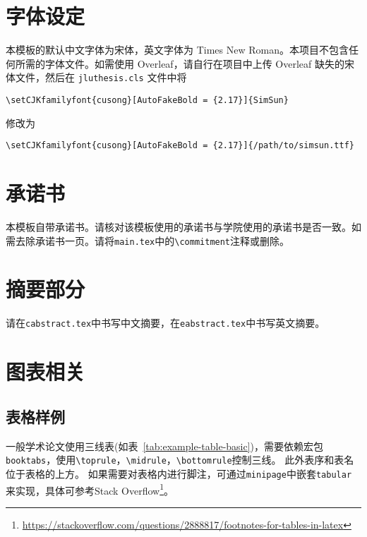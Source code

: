 \section{字体设定}
\label{sec:fontset}

本模板的默认中文字体为宋体，英文字体为 Times New Roman。本项目不包含任何所需的字体文件。如需使用 Overleaf，请自行在项目中上传 Overleaf 缺失的宋体文件，然后在 \verb|jluthesis.cls| 文件中将 
\begin{Verbatim}
\setCJKfamilyfont{cusong}[AutoFakeBold = {2.17}]{SimSun}
\end{Verbatim}
修改为
\begin{Verbatim}
\setCJKfamilyfont{cusong}[AutoFakeBold = {2.17}]{/path/to/simsun.ttf}
\end{Verbatim}

\section{承诺书}
\label{sec:commitment}

本模板自带承诺书。请核对该模板使用的承诺书与学院使用的承诺书是否一致。如需去除承诺书一页。请将\verb|main.tex|中的\verb|\commitment|注释或删除。

\section{摘要部分}
\label{sec:abstract}

请在\verb|cabstract.tex|中书写中文摘要，在\verb|eabstract.tex|中书写英文摘要。


\section{图表相关}
\label{sec:table-figure}

\subsection{表格样例}
\label{sec:table-example}

一般学术论文使用三线表(如表~\ref{tab:example-table-basic})，需要依赖宏包\verb|booktabs|，使用\verb|\toprule|，\verb|\midrule|，\verb|\bottomrule|控制三线。
此外表序和表名位于表格的上方。
如果需要对表格内进行脚注，可通过\texttt{minipage}中嵌套\texttt{tabular}来实现，具体可参考Stack Overflow\footnote{\url{https://stackoverflow.com/questions/2888817/footnotes-for-tables-in-latex}}。

